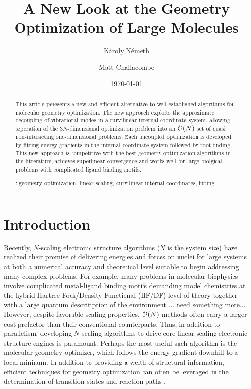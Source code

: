 \documentclass[prl,aps,twocolumn,showpacs,twocolumngrid,superbib]{revtex4}
\begin{document}
\title{
A New Look at the Geometry Optimization of Large Molecules\footnotemark[1]}

\author{K\'aroly N\'emeth\footnotemark[2]}
\author{Matt Challacombe}


\date{\today}

\begin{abstract}
{
This article peresents a new and efficient alternative to well established
algorithms for molecular geometry optimization.   The new approach 
exploits the approximate decoupling of vibrational modes in a curvilinear 
internal coordinate system,  allowing seperation  of the 3$N$-dimensional
optimization problem into an ${\cal{O}}(N)$ set of quasi non-interacting
one-dimensional problems.  Each  uncoupled optimization is developed by fitting 
energy gradients in the internal coordinate system followed by root finding.  
This new approach is competitive with the best  geometry optimization algorithms 
in the litterature, achieves superlinear convergence and works well for large 
biolgical problems with complicated ligand binding motifs.  
}

\smallskip
{}: 
geometry optimization, linear scaling, 
curvilinear internal coordinates, fitting
\end{abstract}
 

\maketitle


\section{Introduction}

Recently, $N$-scaling electronic structure algorithms ($N$ is the system size)  have 
realized their promise of delivering energies and forces on nuclei for 
large systems at both a numerical accuracy and theoretical level suitable to begin 
addressing many complex problems.  For example, many problems in molecular biophysics 
involve complicated metal-ligand binding motifs demanding model chemistries at the 
hybrid Hartree-Fock/Density Functional (HF/DF) level of theory together with a large 
quantum descritiption of the environment ... need something more... 
However, despite favorable scaling properties, ${\cal O}(N)$ methods often carry a larger 
cost prefactor than their conventional counterparts.  Thus, in addition to parallelism, 
developing $N$-scaling algorithms to drive core linear scaling electronic structure engines 
is paramount.  Perhaps the most useful such algorithm is the molecular geometry optimizer, 
which follows the energy gradient downhill to a local mininum.  
In addition to providing a welth of 
structural information, efficient techniques for geometry optimization can often be leveraged in the 
determination of transition states and reaction paths \cite{nudged_elastic_band}.
\end{document}
